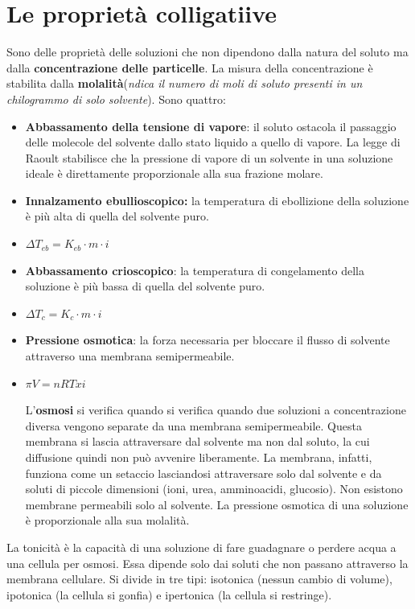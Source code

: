 \documentclass[11pt, a4paper, openright]{book}
\begin{document}
\section{Le proprietà colligatiive}
Sono delle proprietà delle soluzioni che non dipendono dalla natura del soluto ma dalla \textbf{concentrazione delle particelle}.
La misura della concentrazione è stabilita dalla \textbf{molalità}(\textit{ndica il numero di moli di soluto presenti in un chilogrammo di solo solvente}).
Sono quattro:
\begin{itemize}
    \item \textbf{Abbassamento della tensione di vapore}: il soluto ostacola il passaggio delle molecole del solvente dallo stato liquido a quello di vapore.
    La legge di Raoult stabilisce che la pressione di vapore di un solvente in una soluzione ideale è direttamente proporzionale alla sua frazione molare.
    \item \textbf{Innalzamento ebullioscopico:} la temperatura di ebollizione della soluzione è più alta di quella del solvente puro.
    \item \begin{center}
        $\Delta  T_{eb} = K_{eb} \cdot m \cdot i$
    \end{center}
    \item \textbf{Abbassamento crioscopico}: la temperatura di congelamento della soluzione è più bassa di quella del solvente puro.
    \item \begin{center}
        $\Delta T_{c} = K_{c} \cdot m \cdot i$
    \end{center}
    \item \textbf{Pressione osmotica}: la forza necessaria per bloccare il flusso di solvente attraverso una membrana semipermeabile.
    \item \begin{center}
        $\pi V = nRT x i$
    \end{center}
    L'\textbf{osmosi} si verifica quando si verifica quando due soluzioni a concentrazione diversa vengono separate da una membrana semipermeabile. Questa membrana si lascia attraversare dal solvente ma non dal soluto, la cui diffusione quindi non può avvenire liberamente. La membrana, infatti, funziona come un setaccio lasciandosi attraversare solo dal solvente e da soluti di piccole dimensioni (ioni, urea, amminoacidi, glucosio). Non esistono membrane permeabili solo al solvente.
    La pressione osmotica di una soluzione è proporzionale alla sua molalità.
\end{itemize}
La tonicità è la capacità di una soluzione di fare guadagnare o perdere acqua a una cellula per osmosi. Essa dipende solo dai soluti che non passano attraverso la membrana cellulare. Si divide in tre tipi: isotonica (nessun cambio di volume), ipotonica (la cellula si gonfia) e ipertonica (la cellula si restringe).
\end{document}

